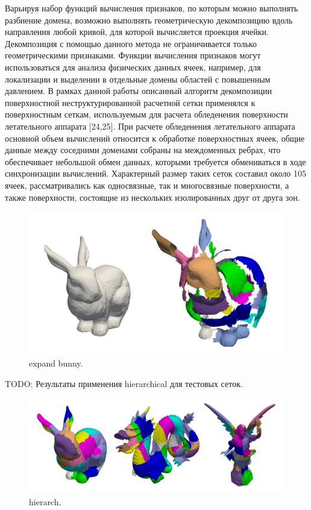 \documentclass[
11pt,%
tightenlines,%
twoside,%
onecolumn,%
nofloats,%
nobibnotes,%
nofootinbib,%
superscriptaddress,%
noshowpacs,%
centertags]%
{revtex4}
\begin{document}
Варьируя набор функций вычисления признаков, по которым можно выполнять разбиение домена, возможно выполнять геометрическую декомпозицию вдоль направления любой кривой, для которой вычисляется проекция ячейки. Декомпозиция с помощью данного метода не ограничивается только геометрическими признаками. Функции вычисления признаков могут использоваться для анализа физических данных ячеек, например, для локализации и выделении в отдельные домены областей с повышенным давлением.
В рамках данной работы описанный алгоритм декомпозиции поверхностной неструктурированной расчетной сетки применялся к поверхностным сеткам, используемым для расчета обледенения поверхности летательного аппарата [24,25]. При расчете обледенения летательного аппарата основной объем вычислений относится к обработке поверхностных ячеек, общие данные между соседними доменами собраны на междоменных ребрах, что обеспечивает небольшой обмен данных, которыми требуется обмениваться в ходе синхронизации вычислений.  Характерный размер таких сеток составил около 105 ячеек, рассматривались как односвязные, так и многосвязные поверхности, а также поверхности, состоящие из нескольких изолированных друг от друга зон.


\begin{figure}[h]
\includegraphics[width=1.0\textwidth]{pics/03-explode-bunny.pdf}
\caption{expand bunny.}\label{fig:03-explode-bunny}
\end{figure}

TODO: Результаты применения hierarchical для тестовых сеток.

\begin{figure}[h]
\includegraphics[width=1.0\textwidth]{pics/03-hierarch.pdf}
\caption{hierarch.}\label{fig:03-hierarch}
\end{figure}
\end{document}
